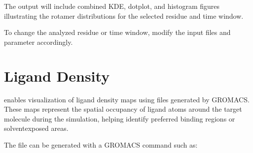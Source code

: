 \documentclass[a4paper,10pt,english]{sphinxmanual}
\begin{document}
\begin{sphinxVerbatim}[commandchars=\\\{\}]
         
         
         
         
         
         
\end{sphinxVerbatim}

\sphinxAtStartPar
The output will include combined KDE, dotplot, and histogram figures illustrating the rotamer distributions for the selected residue and time window.

\sphinxAtStartPar
To change the analyzed residue or time window, modify the input files and  parameter accordingly.


\section{Ligand Density}
\label{\detokenize{Input:ligand-density}}
\sphinxAtStartPar
{} enables visualization of ligand density maps using  files generated by GROMACS. These maps represent the spatial occupancy of ligand atoms around the target molecule during the simulation, helping identify preferred binding regions or solvent\sphinxhyphen{}exposed areas.

\sphinxAtStartPar
The  file can be generated with a GROMACS command such as:
\end{document}
